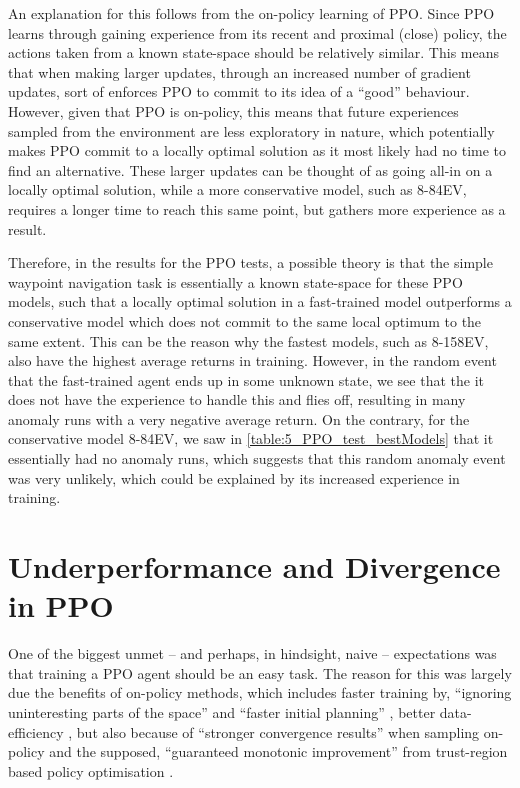 An explanation for this follows from the on-policy learning of PPO. Since PPO learns through gaining experience from its recent and proximal (close) policy, the actions taken from a known state-space should be relatively similar. This means that when making larger updates, through an increased number of gradient updates, sort of enforces PPO to commit to its idea of a ``good'' behaviour. However, given that PPO is on-policy, this means that future experiences sampled from the environment are less exploratory in nature, which potentially makes PPO commit to a locally optimal solution as it most likely had no time to find an alternative. These larger updates can be thought of as going all-in on a locally optimal solution, while a more conservative model, such as 8-84EV, requires a longer time to reach this same point, but gathers more experience as a result.

Therefore, in the results for the PPO tests, a possible theory is that the simple waypoint navigation task is essentially a known state-space for these PPO models, such that a locally optimal solution in a fast-trained model outperforms a conservative model which does not commit to the same local optimum to the same extent. 
This can be the reason why the fastest models, such as 8-158EV, also have the highest average returns in training.
However, in the random event that the fast-trained agent ends up in some unknown state, we see that the it does not have the experience to handle this and flies off, resulting in many anomaly runs with a very negative average return. On the contrary, for the conservative model 8-84EV, we saw in \cref{table:5_PPO_test_bestModels} that it essentially had no anomaly runs, which suggests that this random anomaly event was very unlikely, which could be explained by its increased experience in training. 



\section{Underperformance and Divergence in PPO}
\label{sec:6_underperformance_divergence_PPO}

One of the biggest unmet -- and perhaps, in hindsight, naive -- expectations was that training a PPO agent should be an easy task. The reason for this was largely due the benefits of on-policy methods, which includes faster training by, ``ignoring uninteresting parts of the space'' and ``faster initial planning'' \cite{suttonAndBartoBook}, better data-efficiency \cite{PPO}, but also because of ``stronger convergence results'' when sampling on-policy \cite{suttonAndBartoBook} and the supposed, ``guaranteed monotonic improvement'' from trust-region based policy optimisation \cite{TRPO}.

